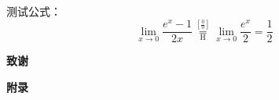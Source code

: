 \documentclass[zihao = -4,cn]{oucart}
\begin{document}
测试公式：
\begin{equation}
 \lim_{x\to 0}{\frac{e^x-1}{2x}}
 \overset{\left[\frac{0}{0}\right]}{\underset{\mathrm{H}}{=}}
 \lim_{x\to 0}{\frac{e^x}{2}}={\frac{1}{2}}
\end{equation}
\newpage

%


\newpage
\begin{center}
 \textbf{致谢} \\
\end{center}

\newpage
\begin{center}
 \textbf{附录} \\
\end{center}
\end{document}
